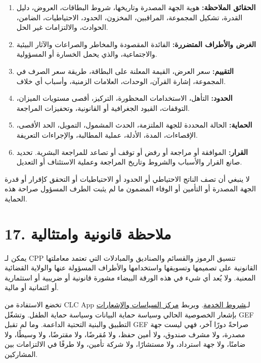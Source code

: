 \documentclass[11pt]{article}
\begin{document}
\begin{enumerate}[leftmargin=*]
\item \textbf{الحقائق الملاحظة:} هوية الجهة المصدرة وتاريخها، شروط البطاقات، العروض، دليل القدرة، تشكيل المجموعة، المراقبين، المخزون، الحدود، الاحتياطيات، الضامن، الحوادث، والالتزامات غير الحل.
\item \textbf{الغرض والأطراف المتضررة:} الفائدة المقصودة والمخاطر والصراعات والآثار البيئية والاجتماعية، والذي يحمل الخسارة أو المسؤولية.
\item \textbf{التقييم:} سعر العرض، القيمة المعلنة على البطاقة، طريقة سعر الصرف في المجموعة، إشارة القرآن، الوحدات، العلامات الزمنية، وأسباب أي خلاف.
\item \textbf{الحدود:} التأهل، الاستخدامات المحظورة، التركيز، أقصى مستويات الميزان، التوقفات، القيود الجغرافية أو القانونية، وتحفيزات المراجعة.
\item \textbf{الحماية:} الحالة المحددة للجهة الملتزمة، الحدث المشمول، التمويل، الحد الأقصى، الإقصاءات، المدة، الأدلة، عملية المطالبة، والإجراءات التعريفة.
\item \textbf{القرار:} الموافقة أو مراجعة أو رفض أو توقف أو تصاعد للمراجعة البشرية. تحديد صانع القرار والأسباب والشروط وتاريخ المراجعة وعملية الاستئناف أو التعديل.
\end{enumerate}
لا ينبغي أن تصف الناتج الاحتياطي أو الحدود أو الاحتياطيات أو التحقق كإقرار أو قدرة الجهة المصدرة أو التأمين أو الوفاء المضمون ما لم يثبت الطرف المسؤول صراحة هذه الحماية.


\section*{17. ملاحظة قانونية وامتثالية}

يمكن لـ CPP تنسيق الرموز والقسائم والصناديق والمبادلات التي تعتمد معاملتها القانونية على تصميمها وتسويقها واستخدامها والأطراف المسؤولة عنها والولاية القضائية المعنية. ولا يُعد أي شيء في هذه الورقة البيضاء مشورة قانونية أو ضريبية أو استثمارية أو ائتمانية أو مالية.

تخضع الاستفادة من CLC App لـ\href{https://docs.cosmolocal.credit/ar/governance/terms}{شروط الخدمة}. ويربط \href{https://docs.cosmolocal.credit/ar/governance/policies}{مركز السياسات والإشعارات} بإشعار الخصوصية الحالي وسياسة حماية البيانات وسياسة حماية الطفل. وتشغّل GEF التطبيق والبنية التحتية الداعمة. وما لم تقبل GEF صراحةً دورًا آخر، فهي ليست جهة مصدرة، ولا مشرف صندوق، ولا أمين حفظ، ولا مُقرضًا، ولا مقترضًا، ولا وسيطًا، ولا ضامنًا، ولا جهة استرداد، ولا مستشارًا، ولا شركة تأمين، ولا طرفًا في الالتزامات بين المشاركين.
\end{document}

